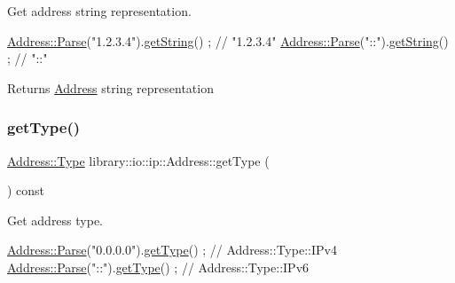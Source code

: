 Get address string representation. 


\begin{DoxyCode}
\hyperlink{classlibrary_1_1io_1_1ip_1_1_address_af8ab0e365de3c00109b456ee94e2590b}{Address::Parse}(\textcolor{stringliteral}{"1.2.3.4"}).\hyperlink{classlibrary_1_1io_1_1ip_1_1_address_aaa3c07764609a34d9f80df26981cad45}{getString}() ; \textcolor{comment}{// "1.2.3.4"}
\hyperlink{classlibrary_1_1io_1_1ip_1_1_address_af8ab0e365de3c00109b456ee94e2590b}{Address::Parse}(\textcolor{stringliteral}{"::"}).\hyperlink{classlibrary_1_1io_1_1ip_1_1_address_aaa3c07764609a34d9f80df26981cad45}{getString}() ; \textcolor{comment}{// "::"}
\end{DoxyCode}


\begin{DoxyReturn}{Returns}
\hyperlink{classlibrary_1_1io_1_1ip_1_1_address}{Address} string representation 
\end{DoxyReturn}
\mbox{\label{classlibrary_1_1io_1_1ip_1_1_address_abd4d3f82370ea5882822a85876f670d8}} 
\subsubsection{\texorpdfstring{get\+Type()}{getType()}}
{\footnotesize\ttfamily \hyperlink{classlibrary_1_1io_1_1ip_1_1_address_a1a4f284eb6f5f52b67f2e34a93f225af}{Address\+::\+Type} library\+::io\+::ip\+::\+Address\+::get\+Type (\begin{DoxyParamCaption}{ }\end{DoxyParamCaption}) const}



Get address type. 


\begin{DoxyCode}
\hyperlink{classlibrary_1_1io_1_1ip_1_1_address_af8ab0e365de3c00109b456ee94e2590b}{Address::Parse}(\textcolor{stringliteral}{"0.0.0.0"}).\hyperlink{classlibrary_1_1io_1_1ip_1_1_address_abd4d3f82370ea5882822a85876f670d8}{getType}() ; \textcolor{comment}{// Address::Type::IPv4}
\hyperlink{classlibrary_1_1io_1_1ip_1_1_address_af8ab0e365de3c00109b456ee94e2590b}{Address::Parse}(\textcolor{stringliteral}{"::"}).\hyperlink{classlibrary_1_1io_1_1ip_1_1_address_abd4d3f82370ea5882822a85876f670d8}{getType}() ; \textcolor{comment}{// Address::Type::IPv6}
\end{DoxyCode}


